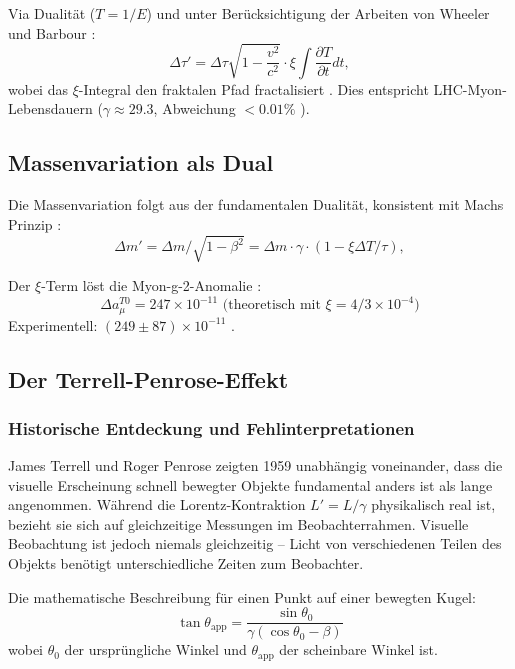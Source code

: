 	Via Dualität ($T = 1/E$) und unter Berücksichtigung der Arbeiten von Wheeler \cite{wheeler1990} und Barbour \cite{barbour1999}:
	\begin{equation}
		\Delta \tau' = \Delta \tau \sqrt{1 - \frac{v^2}{c^2}} \cdot \xi \int \frac{\partial T}{\partial t} dt,
	\end{equation}
	wobei das $\xi$-Integral den fraktalen Pfad fractalisiert \cite{pascher2025qm}. Dies entspricht LHC-Myon-Lebensdauern ($\gamma \approx 29.3$, Abweichung $<0.01\%$ \cite{pdg2024, atlas2023}).
	
	\subsection{Massenvariation als Dual}
	Die Massenvariation folgt aus der fundamentalen Dualität, konsistent mit Machs Prinzip \cite{mach1883, sciama1953}:
	\begin{equation}
		\Delta m' = \Delta m / \sqrt{1 - \beta^2} = \Delta m \cdot \gamma \cdot (1 - \xi \Delta T / \tau),
	\end{equation}
	
	Der $\xi$-Term löst die Myon-g-2-Anomalie \cite{muong2_2023, pascher2025g2}:
	\begin{equation}
		\Delta a_\mu^{T0} = 247 \times 10^{-11} \text{ (theoretisch mit } \xi = 4/3 \times 10^{-4})
	\end{equation}
	Experimentell: $(249 \pm 87) \times 10^{-11}$ \cite{fermilab2023}.
	
	\subsection{Der Terrell-Penrose-Effekt}
	
	\subsubsection{Historische Entdeckung und Fehlinterpretationen}
	
	James Terrell \cite{terrell1959} und Roger Penrose \cite{penrose1959} zeigten 1959 unabhängig voneinander, dass die visuelle Erscheinung schnell bewegter Objekte fundamental anders ist als lange angenommen. Während die Lorentz-Kontraktion $L' = L/\gamma$ physikalisch real ist, bezieht sie sich auf gleichzeitige Messungen im Beobachterrahmen. Visuelle Beobachtung ist jedoch niemals gleichzeitig – Licht von verschiedenen Teilen des Objekts benötigt unterschiedliche Zeiten zum Beobachter.
	
	Die mathematische Beschreibung für einen Punkt auf einer bewegten Kugel:
	\begin{equation}
		\tan\theta_{\text{app}} = \frac{\sin\theta_0}{\gamma(\cos\theta_0 - \beta)}
	\end{equation}
	wobei $\theta_0$ der ursprüngliche Winkel und $\theta_{\text{app}}$ der scheinbare Winkel ist.
	
